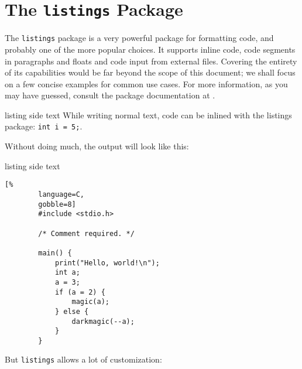 \documentclass[article,a4paper,oneside,10pt]{memoir}
\newcommand\code[1]{\texttt{#1}}
\begin{document}
\newpage
\chapter{The \code{listings}      Package \cite{listings}}
\label{chap:listings}

The \code{listings}  package is a  very powerful package for  formatting code,
and probably one of the  more popular choices\footnotemark. It supports inline
code, code  segments in  paragraphs and  floats and  code input  from external
files. Covering the entirety of its capabilities would be far beyond the scope
of this  document; we  shall focus on  a few concise  examples for  common use
cases.  For  more information, as  you may  have guessed, consult  the package
documentation at \cite{listings}.



\begin{tcblisting}{listing side text}
\lstset{language=C}
While writing normal text, code
can be inlined with the listings
package: \lstinline!int i = 5;!.
\end{tcblisting}


Without doing much, the output will look like this:
\begin{tcblisting}{listing side text}
    \begin{lstlisting}[%
        language=C,
        gobble=8]
        #include <stdio.h>

        /* Comment required. */

        main() {
            print("Hello, world!\n");
            int a;
            a = 3;
            if (a = 2) {
                magic(a);
            } else {
                darkmagic(--a);
            }
        }
    \end{lstlisting}
\end{tcblisting}

\newpage
But \code{listings} allows a lot of customization:
\end{document}
